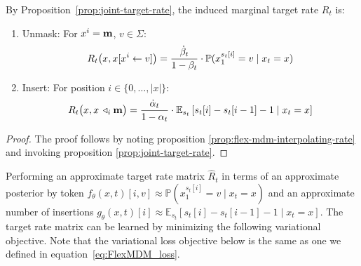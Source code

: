 \begin{appprop} \label{prop:appendix-flexmdm-rate}
By Proposition~\ref{prop:joint-target-rate}, the induced marginal target rate \(R_t\) is:
\begin{enumerate}[leftmargin=*,itemsep=0pt,topsep=0pt] 
    \item Unmask: For \(x^i = \mathbf{m}\), \(v \in \Sigma\):
\begin{align}
    R_t\big(x, x[x^{i} \leftarrow v]\big)
    = \frac{\dot{\beta}_t}{1 - \beta_t} \cdot 
    \mathbb{P}(x_1^{s_t[i]} = v \mid x_t = x)
\end{align}

\item Insert: For position $i \in \{0, \dots, |x|\}$:
\begin{align}
    R_t\big(x, x\,\triangleleft_{i}\mathbf{m}\big)
    = \frac{\dot{\alpha}_t}{1 - \alpha_t} \cdot
    \mathbb{E}_{s_t} \left[ s_t[i] - s_t[i-1]-1 \mid x_t = x \right]
\end{align}
\end{enumerate}
\end{appprop}
\begin{proof}
The proof follows by noting proposition \ref{prop:flex-mdm-interpolating-rate} and invoking proposition \ref{prop:joint-target-rate}.
\end{proof}


Performing an approximate target rate matrix $\hat{R}_t$ in terms of an approximate posterior by token $f_\theta(x, t)[i, v] \approx \mathbb{P}(x_1^{s_t[i]} = v \mid x_t = x)$ and an approximate number of insertions $g_\theta(x, t)[i] \approx \mathbb{E}_{s_t} \left[ s_t[i] - s_t[i-1]-1 \mid x_t = x \right]$. The target rate matrix can be learned by minimizing the following variational objective. Note that the variational loss objective below is the same as one we defined in equation~\ref{eq:FlexMDM_loss}.

